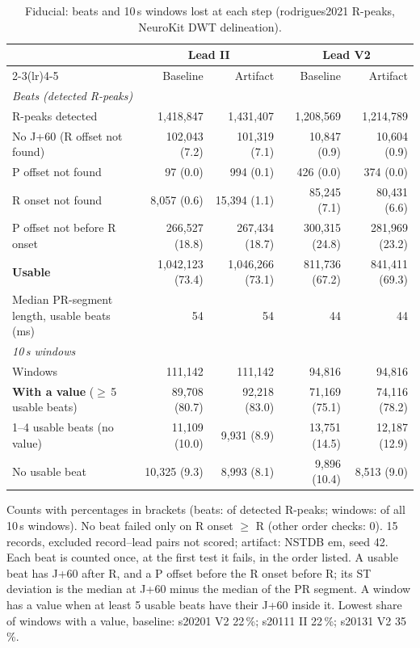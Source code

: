 \begin{table}[htbp]
\centering
\small
\caption{Fiducial: beats and 10\,s windows lost at each step (rodrigues2021 R-peaks, NeuroKit DWT delineation).}
\label{tab:appendix_fiducial_pr_loss}
\begin{tabular}{lrrrr}
\toprule
& \multicolumn{2}{c}{Lead II} & \multicolumn{2}{c}{Lead V2} \\
\cmidrule(lr){2-3}\cmidrule(lr){4-5}
 & Baseline & Artifact & Baseline & Artifact \\
\midrule
\multicolumn{5}{l}{\textit{Beats (detected R-peaks)}} \\
R-peaks detected & 1{,}418{,}847 & 1{,}431{,}407 & 1{,}208{,}569 & 1{,}214{,}789 \\
No J+60 (R offset not found) & 102{,}043 (7.2) & 101{,}319 (7.1) & 10{,}847 (0.9) & 10{,}604 (0.9) \\
P offset not found & 97 (0.0) & 994 (0.1) & 426 (0.0) & 374 (0.0) \\
R onset not found & 8{,}057 (0.6) & 15{,}394 (1.1) & 85{,}245 (7.1) & 80{,}431 (6.6) \\
P offset not before R onset & 266{,}527 (18.8) & 267{,}434 (18.7) & 300{,}315 (24.8) & 281{,}969 (23.2) \\
\textbf{Usable} & 1{,}042{,}123 (73.4) & 1{,}046{,}266 (73.1) & 811{,}736 (67.2) & 841{,}411 (69.3) \\
Median PR-segment length, usable beats (ms) & 54 & 54 & 44 & 44 \\
\midrule
\multicolumn{5}{l}{\textit{10\,s windows}} \\
Windows & 111{,}142 & 111{,}142 & 94{,}816 & 94{,}816 \\
\textbf{With a value} ($\geq$\,5 usable beats) & 89{,}708 (80.7) & 92{,}218 (83.0) & 71{,}169 (75.1) & 74{,}116 (78.2) \\
1--4 usable beats (no value) & 11{,}109 (10.0) & 9{,}931 (8.9) & 13{,}751 (14.5) & 12{,}187 (12.9) \\
No usable beat & 10{,}325 (9.3) & 8{,}993 (8.1) & 9{,}896 (10.4) & 8{,}513 (9.0) \\
\bottomrule
\end{tabular}

\par\smallskip\footnotesize Counts with percentages in brackets (beats: of detected R-peaks; windows: of all 10\,s windows). No beat failed only on R onset $\geq$ R (other order checks: 0). 15 records, excluded record--lead pairs not scored; artifact: NSTDB em, seed 42. Each beat is counted once, at the first test it fails, in the order listed. A usable beat has J+60 after R, and a P offset before the R onset before R; its ST deviation is the median at J+60 minus the median of the PR segment. A window has a value when at least 5 usable beats have their J+60 inside it. Lowest share of windows with a value, baseline: s20201 V2 22\,\%; s20111 II 22\,\%; s20131 V2 35\,\%.
\end{table}
